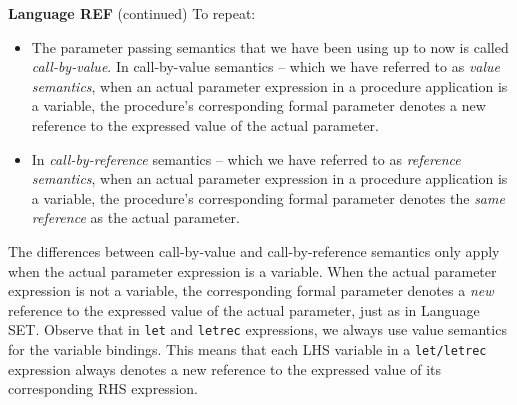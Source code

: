 \begin{minipage}[t]{\sw}
\slidenumber
\LARGE
{\bf Language REF} (continued)\exx
To repeat:
\begin{itemize}
\item
  The parameter passing semantics
  that we have been using up to now
  is called {\em call-by-value}.
  In call-by-value semantics --
  which we have referred to as {\em value semantics},
  when an actual parameter expression
  in a procedure application is a variable,
  the procedure's corresponding formal parameter denotes
  a new reference to the expressed value
  of the actual parameter.
\item
  In {\em call-by-reference} semantics --
  which we have referred to as {\em reference semantics},
  when an actual parameter expression
  in a procedure application is a variable,
  the procedure's corresponding formal parameter denotes
  the {\em same reference} as the actual parameter.
\end{itemize}
The differences between call-by-value and call-by-reference semantics
only apply when the actual parameter expression is a variable.
When the actual parameter expression is not a variable,
the corresponding formal parameter denotes
a {\em new} reference to the expressed value
of the actual parameter, just as in Language SET.\exx
Observe that in \verb'let' and \verb'letrec' expressions,
we always use value semantics for the variable bindings.
This means that each LHS variable
in a \verb'let/letrec' expression always denotes
a new reference to the expressed value
of its corresponding RHS expression.
\end{minipage}
\clearpage
